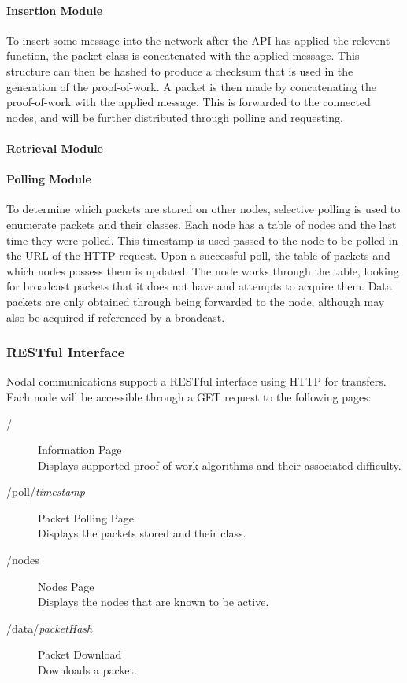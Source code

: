 			\paragraph{Insertion Module}
				To insert some message into the network after the API has applied the relevent function, the packet class is concatenated with the applied message. This structure can then be hashed to produce a checksum that is used in the generation of the proof-of-work. A packet is then made by concatenating the proof-of-work with the applied message. This is forwarded to the connected nodes, and will be further distributed through polling and requesting.
					
			\paragraph{Retrieval Module}
			\paragraph{Polling Module}
				To determine which packets are stored on other nodes, selective polling is used to enumerate packets and their classes. Each node has a table of nodes and the last time they were polled. This timestamp is used passed to the node to be polled in the URL of the HTTP request. Upon a successful poll, the table of packets and which nodes possess them is updated. The node works through the table, looking for broadcast packets that it does not have and attempts to acquire them. Data packets are only obtained through being forwarded to the node, although may also be acquired if referenced by a broadcast.
		\subsubsection*{RESTful Interface}
			Nodal communications support a RESTful interface using HTTP for transfers. Each node will be accessible through a GET request to the following pages:
			\begin{description}
				\item[/] Information Page \\ Displays supported proof-of-work algorithms and their associated difficulty.
				\item[/poll/\textit{timestamp}] Packet Polling Page \\ Displays the packets stored and their class.
				\item[/nodes] Nodes Page \\ Displays the nodes that are known to be active.
				\item[/data/\textit{packetHash}] Packet Download \\ Downloads a packet.
			\end{description}
			
